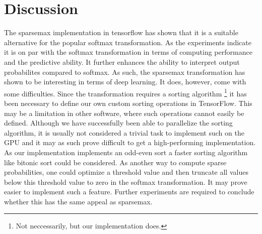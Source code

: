 \section{Discussion}
The sparsemax implementation in tensorflow has shown that it is a suitable alternative for the popular softmax transformation. As the experiments indicate it is on par with the softmax transformation in terms of computing performance and the predictive ability. It further enhances the ability to interpret output probabilites compared to softmax. As such, the sparsemax transformation has shown to be interesting in terms of deep learning. It does, however, come with some difficulties. Since the transformation requires a sorting algorithm \footnote{Not neccessarily, but our implementation does.} it has been necessary to define our own custom sorting operations in TensorFlow. This  may be a limitation in other software, where such operations cannot easily be defined. Although we have successfully been able to parallelize the sorting algorithm, it is usually not considered a trivial task to implement such on the GPU and it may as such prove difficult to get a high-performing implementation. As our implementation implements an odd-even sort a faster sorting algorithm like bitonic sort could be considered. As another way to compute sparse probabilities, one could optimize a threshold value and then truncate all values below this threshold value to zero in the softmax transformation. It may prove easier to implement such a feature. Further experiments are required to conclude whether this has the same appeal as sparsemax.